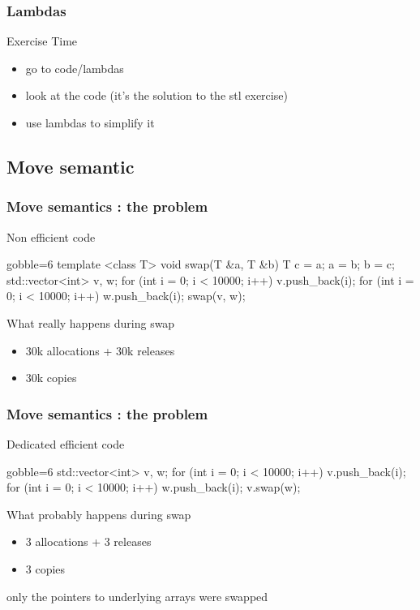 \begin{frame}[fragile]
  \frametitle{Lambdas}
  \begin{alertblock}{Exercise Time}
    \begin{itemize}
    \item go to code/lambdas
    \item look at the code (it's the solution to the stl exercise)
    \item use lambdas to simplify it
    \end{itemize}
  \end{alertblock}
\end{frame}

\subsection[mv]{Move semantic}

\begin{frame}[fragile]
  \frametitle{Move semantics : the problem}
  \begin{exampleblock}{Non efficient code}
    \begin{cppcode*}{gobble=6}
      template <class T>
      void swap(T &a, T &b) {
        T c = a;
        a = b;
        b = c;
      }
      std::vector<int> v, w;
      for (int i = 0; i < 10000; i++) v.push_back(i);
      for (int i = 0; i < 10000; i++) w.push_back(i);
      swap(v, w);
    \end{cppcode*}
  \end{exampleblock}
  \pause
  \begin{alertblock}{What really happens during swap}
    \begin{itemize}
    \item 30k allocations + 30k releases
    \item 30k copies
    \end{itemize}
  \end{alertblock}
\end{frame}

\begin{frame}[fragile]
  \frametitle{Move semantics : the problem}
  \begin{exampleblock}{Dedicated efficient code}
    \begin{cppcode*}{gobble=6}
      std::vector<int> v, w;
      for (int i = 0; i < 10000; i++) v.push_back(i);
      for (int i = 0; i < 10000; i++) w.push_back(i);
      v.swap(w);
      \end{cppcode*}
  \end{exampleblock}
  \pause
  \begin{block}{What probably happens during swap}
    \begin{itemize}
    \item 3 allocations + 3 releases
    \item 3 copies
    \end{itemize}
    only the pointers to underlying arrays were swapped
  \end{block}
\end{frame}

